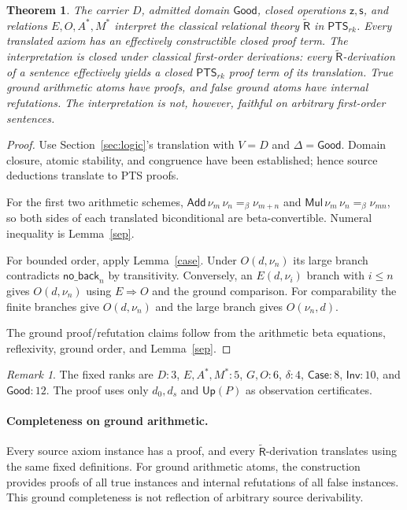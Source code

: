 \documentclass[11pt,a4paper]{article}
\newcommand{\PTS}{\mathsf{PTS}_{rk}}
\newcommand{\Rt}{\widetilde{\mathsf R}}
\newcommand{\Good}{\mathsf{Good}}
\newcommand{\Case}{\mathsf{Case}}
\newcommand{\Inv}{\mathsf{Inv}}
\newcommand{\Add}{\mathsf{Add}}
\newcommand{\Mul}{\mathsf{Mul}}
\newcommand{\z}{\mathsf z}
\newcommand{\suc}{\mathsf s}
\newcommand{\Up}{\mathsf{Up}}
\newtheorem{theorem}[lemma]{Theorem}
\theoremstyle{remark}\newtheorem*{remark}{Remark}
\begin{document}
\begin{theorem}\label{main}
The carrier $D$, admitted domain $\Good$, closed operations $\z,\suc$,
and relations $E,O,A^*,M^*$ interpret the classical relational theory
$\Rt$ in $\PTS$. Every translated axiom has an effectively constructible
closed proof term. The interpretation is closed under classical first-order
derivations: every $\Rt$-derivation of a sentence effectively yields a closed
$\PTS$ proof term of its translation. True ground arithmetic atoms have
proofs, and false ground atoms have internal refutations. The interpretation
is not, however, faithful on arbitrary first-order sentences.
\end{theorem}
\begin{proof}
Use Section~\ref{sec:logic}'s translation with $V=D$ and $\Delta=\Good$.
Domain closure, atomic stability, and congruence have been established;
hence source deductions translate to PTS proofs.

For the first two arithmetic schemes, $\Add\,\nu_m\,\nu_n=_\beta\nu_{m+n}$
and $\Mul\,\nu_m\,\nu_n=_\beta\nu_{mn}$, so both sides of each translated
biconditional are beta-convertible. Numeral inequality is Lemma~\ref{sep}.

For bounded order, apply Lemma~\ref{case}. Under $O(d,\nu_n)$ its large
branch contradicts $\mathsf{no\_back}_n$ by transitivity. Conversely, an
$E(d,\nu_i)$ branch with $i\le n$ gives $O(d,\nu_n)$ using
$E\Rightarrow O$ and the ground comparison. For comparability the finite
branches give $O(d,\nu_n)$ and the large branch gives $O(\nu_n,d)$.

The ground proof/refutation claims follow from the arithmetic beta equations,
reflexivity, ground order, and Lemma~\ref{sep}.
\end{proof}
\begin{remark}
The fixed ranks are $D:3$, $E,A^*,M^*:5$, $G,O:6$, $\delta:4$,
$\Case:8$, $\Inv:10$, and $\Good:12$. The proof uses only $d_0,d_s$
and $\Up(P)$ as observation certificates.
\end{remark}

\paragraph{Completeness on ground arithmetic.}
Every source axiom instance has a proof, and every $\Rt$-derivation translates
using the same fixed definitions. For ground arithmetic atoms, the construction
provides proofs of all true instances and internal refutations of all false
instances. This ground completeness is not reflection of arbitrary source
derivability.
\end{document}
